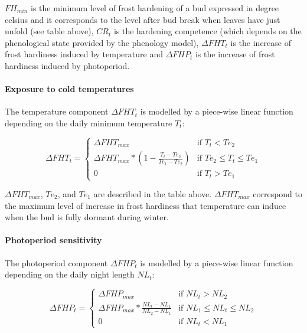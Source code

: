 \documentclass[preprint,12pt,authoryear]{elsarticle}
\begin{document}
\noindent $FH_{min}$ is the minimum level of frost hardening of a bud expressed in degree celsius and it corresponds to the level after bud break when leaves have just unfold (see table above), $CR_t$ is the hardening competence (which depends on the phenological state provided by the phenology model), $\Delta FHT_t$ is the increase of frost hardiness induced by temperature and $\Delta FHP_t$ is the increase of frost hardiness induced by photoperiod.

\paragraph{Exposure to cold temperatures}

The temperature component $\Delta FHT_t$ is modelled by a piece-wise linear function depending on the daily minimum temperature $T_t$:

\begin{equation}
  \Delta FHT_t =
    \begin{cases}
      \Delta FHT_{max} & \text{if $T_t < Te_2$}\\
      \Delta FHT_{max}*(1-\frac{T_t-Te_2}{Te_1-Te_2}) & \text{if $Te_2 \leq T_t \leq Te_1$}\\
      0 & \text{if $T_t > Te_1$}
    \end{cases}       
\end{equation}

\noindent $\Delta FHT_{max}$, $Te_2$, and $Te_1$ are described in the table above. $\Delta FHT_{max}$ correspond to the maximum level of increase in frost hardiness that temperature can induce when the bud is fully dormant during winter.

\paragraph{Photoperiod sensitivity}

The photoperiod component $\Delta FHP_t$ is modelled by a piece-wise linear function depending on the daily night length $NL_t$:

\begin{equation}
  \Delta FHP_t =
    \begin{cases}
      \Delta FHP_{max} & \text{if $NL_t > NL_2$}\\
      \Delta FHP_{max}*\frac{NL_t-NL_1}{NL_2-NL_1} & \text{if $NL_1 \leq NL_t \leq NL_2$}\\
      0 & \text{if $NL_t < NL_1$}
    \end{cases}       
\end{equation}
\end{document}
